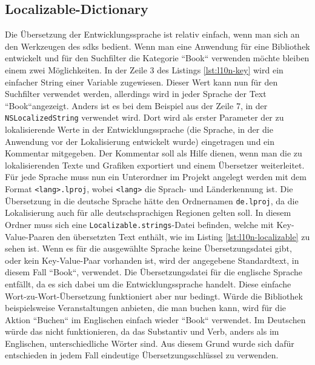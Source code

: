 \subsection{Localizable-Dictionary}
Die Übersetzung der Entwicklungssprache ist relativ einfach, wenn man sich an den Werkzeugen des \Glspl{sdk} bedient.
Wenn man eine Anwendung für eine Bibliothek entwickelt und für den Suchfilter die Kategorie ``Book`` verwenden möchte bleiben einem zwei Möglichkeiten.
In der Zeile 3 des Listings \ref{lst:l10n-key} wird ein einfacher String einer Variable zugewiesen.
Dieser Wert kann nun für den Suchfilter verwendet werden, allerdings wird in jeder Sprache der Text ``Book``angezeigt.
Anders ist es bei dem Beispiel aus der Zeile 7, in der \texttt{NSLocalizedString} verwendet wird.
Dort wird als erster Parameter der zu lokalisierende Werte in der Entwicklungssprache (die Sprache, in der die Anwendung vor der Lokalisierung entwickelt wurde) eingetragen und ein Kommentar mitgegeben.
Der Kommentar soll als Hilfe dienen, wenn man die zu lokalisierenden Texte und Grafiken exportiert und einem Übersetzer weiterleitet.\pbreak%
%
Für jede Sprache muss nun ein Unterordner im Projekt angelegt werden mit dem Format \texttt{<lang>.lproj}, wobei \texttt{<lang>} die Sprach- und Länderkennung ist.
Die Übersetzung in die deutsche Sprache hätte den Ordnernamen \texttt{de.lproj}, da die Lokalisierung auch für alle deutschsprachigen Regionen gelten soll.
In diesem Ordner muss sich eine \texttt{Localizable.strings}-Datei befinden, welche mit Key-Value-Paaren den übersetzten Text enthält, wie im Listing \ref{lst:l10n-localizable} zu sehen ist.
Wenn es für die ausgewählte Sprache keine Übersetzungsdatei gibt, oder kein Key-Value-Paar vorhanden ist, wird der angegebene Standardtext, in diesem Fall ``Book``, verwendet. Die Übersetzungsdatei für die englische Sprache entfällt, da es sich dabei um die Entwicklungssprache handelt.\pbreak%
%
Diese einfache Wort-zu-Wort-Übersetzung funktioniert aber nur bedingt.
Würde die Bibliothek beispielsweise Veranstaltungen anbieten, die man buchen kann, wird für die Aktion ``Buchen`` im Englischen einfach wieder ``Book`` verwendet.
Im Deutschen würde das nicht funktionieren, da das Substantiv und Verb, anders als im Englischen, unterschiedliche Wörter sind.
Aus diesem Grund wurde sich dafür entschieden in jedem Fall eindeutige Übersetzungsschlüssel zu verwenden.
